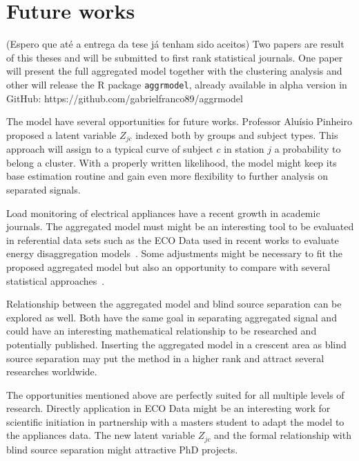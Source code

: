 
\section{Future works}
\label{sec:future}

(Espero que até a entrega da tese já tenham sido aceitos)
Two papers are result of this theses and will be submitted to first rank statistical journals. One paper will present the full aggregated model together with the clustering analysis and other will release the R package \texttt{aggrmodel}, already available in alpha version in GitHub: https://github.com/gabrielfranco89/aggrmodel

The model have several opportunities for future works. Professor Aluísio Pinheiro proposed a latent variable $Z_{jc}$ indexed both by groups and subject types. This approach will assign to a typical curve of subject $c$ in station $j$ a probability to belong a cluster. With a properly written likelihood, the model might keep its base estimation routine and gain even more flexibility to further analysis on separated signals.

Load monitoring of electrical appliances have a recent growth in academic journals. The aggregated model must might be an interesting tool to be evaluated in referential data sets such as the ECO Data used in recent works to evaluate energy disaggregation models~\cite{beckel2014eco}. Some adjustments might be necessary to fit the proposed aggregated model but also an opportunity to compare with several statistical approaches~\cite{schirmer2019evaluation,schirmer2019integration,schirmer2020energy}. 

Relationship between the aggregated model and blind source separation can be explored as well. Both have the same goal in separating aggregated signal and could have an interesting mathematical relationship to be researched and potentially published. Inserting the aggregated model in a crescent area as blind source separation may put the method in a higher rank and attract several researches worldwide.

The opportunities mentioned above are perfectly suited for all multiple levels of research. Directly application in ECO Data might be an interesting work for scientific initiation in partnership with a masters student to adapt the model to the appliances data. The new latent variable $Z_{jc}$ and the formal relationship with blind source separation might attractive PhD projects.